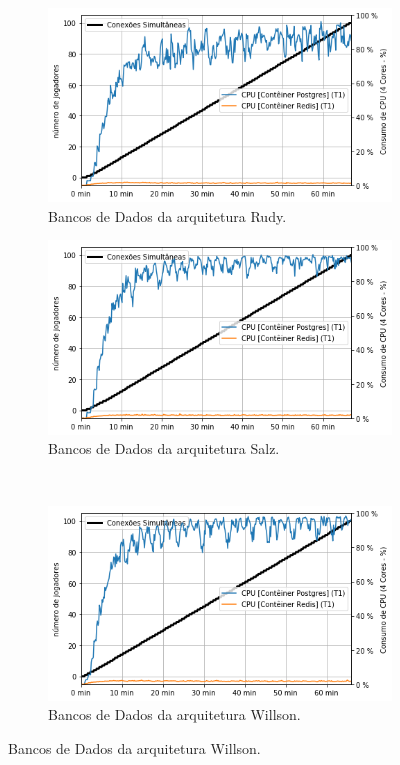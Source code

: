 \begin{figure}[htb!]
    \caption{Consumo de \ac{cpu} dos bancos de dados.}
    \label{fig:experimento_db_cpu}

    \begin{subfigure}{0.5\textwidth}
        \centering
        \includegraphics[width=.95\linewidth]{figuras/testes/r_cpu_db.png}
        \caption{Bancos de Dados da arquitetura Rudy.}
        \label{fig:r_cpu_db}
    \end{subfigure}%
    \begin{subfigure}{0.5\textwidth}
        \centering
        \includegraphics[width=.95\linewidth]{figuras/testes/s_cpu_db.png}
        \caption{Bancos de Dados da arquitetura Salz.}
        \label{fig:s_cpu_db}
    \end{subfigure}\\

    \begin{subfigure}{0.5\textwidth}
        \centering
        \includegraphics[width=.95\linewidth]{figuras/testes/w_cpu_db.png}
        \caption{Bancos de Dados da arquitetura Willson.}
        \label{fig:w_cpu_db}
    \end{subfigure}


\end{figure}
